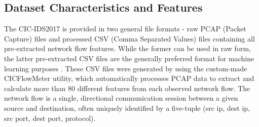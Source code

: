 \subsection{Dataset Characteristics and Features} 
The CIC-IDS2017 is provided in two general file formats - raw PCAP (Packet Capture) files and processed CSV (Comma Separated Values) files containing all pre-extracted network flow features. While the former can be used in raw form, the latter pre-extracted CSV files are the generally preferred format for machine learning purposes \parencite {sharafaldin2018toward}. These CSV files were generated by using the custom-made CICFlowMeter utility, which automatically processes PCAP data to extract and calculate more than 80 different features from each observed network flow. The network flow is a single, directional communication session between a given source and destination, often uniquely identified by a five-tuple (src ip, dest ip, src port, dest port, protocol).

